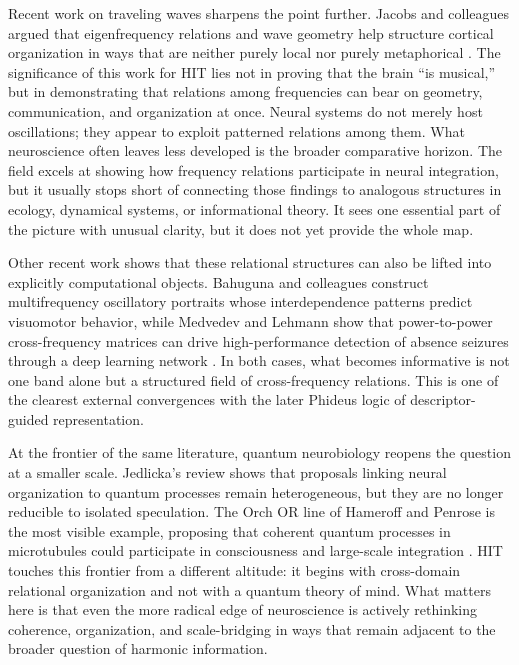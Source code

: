 Recent work on traveling waves sharpens the point further. Jacobs and colleagues argued that eigenfrequency relations and wave geometry help structure cortical organization in ways that are neither purely local nor purely metaphorical \parencite{jacobs_2025}. The significance of this work for HIT lies not in proving that the brain \enquote{is musical,} but in demonstrating that relations among frequencies can bear on geometry, communication, and organization at once. Neural systems do not merely host oscillations; they appear to exploit patterned relations among them. What neuroscience often leaves less developed is the broader comparative horizon. The field excels at showing how frequency relations participate in neural integration, but it usually stops short of connecting those findings to analogous structures in ecology, dynamical systems, or informational theory. It sees one essential part of the picture with unusual clarity, but it does not yet provide the whole map.

Other recent work shows that these relational structures can also be lifted into explicitly computational objects. Bahuguna and colleagues construct multifrequency oscillatory portraits whose interdependence patterns predict visuomotor behavior, while Medvedev and Lehmann show that power-to-power cross-frequency matrices can drive high-performance detection of absence seizures through a deep learning network \parencite{bahuguna_2025, medvedev_2025}. In both cases, what becomes informative is not one band alone but a structured field of cross-frequency relations. This is one of the clearest external convergences with the later Phideus logic of descriptor-guided representation.

At the frontier of the same literature, quantum neurobiology reopens the question at a smaller scale. Jedlicka's review shows that proposals linking neural organization to quantum processes remain heterogeneous, but they are no longer reducible to isolated speculation. The Orch OR line of Hameroff and Penrose is the most visible example, proposing that coherent quantum processes in microtubules could participate in consciousness and large-scale integration \parencite{jedlicka_2017, hameroff_2014}. HIT touches this frontier from a different altitude: it begins with cross-domain relational organization and not with a quantum theory of mind. What matters here is that even the more radical edge of neuroscience is actively rethinking coherence, organization, and scale-bridging in ways that remain adjacent to the broader question of harmonic information.

